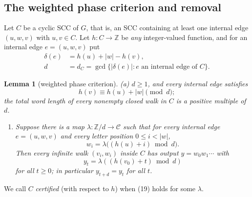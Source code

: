 \documentclass[11pt,reqno]{amsart}
\newtheorem{lemma}[theorem]{Lemma}
\theoremstyle{definition}
\theoremstyle{remark}
\providecommand{\tightlist}{\setlength{\itemsep}{0pt}\setlength{\parskip}{0pt}}
\begin{document}
\subsection{The weighted phase criterion and removal}\label{sec:4.2}

Let \(C\) be a cyclic SCC of \(G\), that is, an SCC containing at least
one internal edge \((u,w,v)\) with \(u,v\in C\). Let \(h:C\to\mathbb Z\)
be \emph{any} integer-valued function, and for an internal edge
\(e=(u,w,v)\) put
\[
\begin{aligned}
\delta(e)&=h(u)+|w|-h(v),\\
d&=d_C=\gcd\{|\delta(e)|:e\text{ an internal edge of }C\}.
\end{aligned}
\]

\begin{samepage}
\begin{lemma}[weighted phase criterion]\leavevmode\label{thm:12}
(a) \(d\ge1\), and every
internal edge satisfies
\[
h(v)\equiv h(u)+|w|\pmod d;
\]
the total word
length of every nonempty closed walk in \(C\) is a positive multiple of \(d\).

\begin{enumerate}
\def\labelenumi{(\alph{enumi})}
\setcounter{enumi}{1}
\tightlist
\item
  Suppose there is a map \(\lambda:\mathbb Z/d\to\mathcal C\) such that
  for every internal edge \(e=(u,w,v)\) and every letter position
  \(0\le i<|w|\),
  \[
  w_i=\lambda\bigl((h(u)+i)\bmod d\bigr).
  \tag{19}\label{eq:19}
  \]
  Then every infinite walk \((v_i,w_i)\) inside \(C\) has output
  \(y=w_0w_1\cdots\) with
  \[
  y_t=\lambda((h(v_0)+t)\bmod d)
  \]
  for all
  \(t\ge0\); in particular \(y_{t+d}=y_t\) for all \(t\).
\end{enumerate}
\label{thm-end:12}
\end{lemma}
\end{samepage}

We call \(C\) \emph{certified} (with respect to \(h\)) when (19) holds for
some \(\lambda\).
\end{document}
